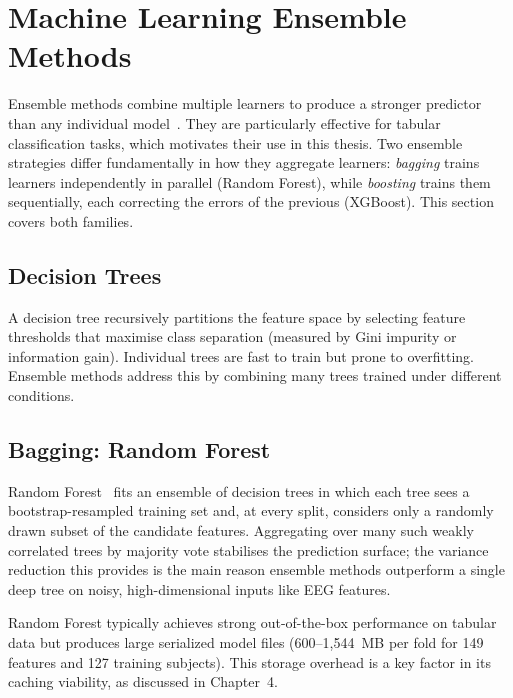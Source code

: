 \section{Machine Learning Ensemble Methods}
\label{sec:ensemble_methods}
Ensemble methods combine multiple learners to produce a stronger predictor
than any individual model~\cite{hastie2009elements}. They are particularly
effective for tabular classification tasks, which motivates their use in
this thesis. Two ensemble strategies differ fundamentally in how they
aggregate learners: \textit{bagging} trains learners independently in
parallel (Random Forest), while \textit{boosting} trains them sequentially,
each correcting the errors of the previous (XGBoost). This section covers
both families.

\subsection{Decision Trees}

A decision tree recursively partitions the feature space by selecting
feature thresholds that maximise class separation (measured by Gini
impurity or information gain). Individual trees are fast to train but
prone to overfitting. Ensemble methods address this by combining many
trees trained under different conditions.

\subsection{Bagging: Random Forest}

Random Forest~\cite{breiman2001random} fits an ensemble of decision trees in 
which each tree sees a bootstrap-resampled training set and, at every split, 
considers only a randomly drawn subset of the candidate features. Aggregating 
over many such weakly correlated trees by majority vote stabilises the prediction 
surface; the variance reduction this provides is the main reason ensemble methods 
outperform a single deep tree on noisy, high-dimensional inputs like EEG features.

Random Forest typically achieves strong out-of-the-box performance on
tabular data but produces large serialized model files (600--1{,}544~MB
per fold for 149 features and 127 training subjects). This storage
overhead is a key factor in its caching viability, as discussed in
Chapter~4.

